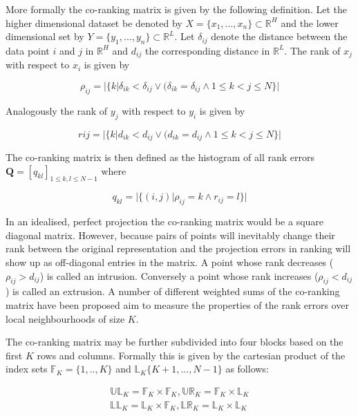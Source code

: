 More formally the co-ranking matrix is given by the following definition. Let the higher dimensional dataset be denoted by $X = \{x_1, ..., x_n\} \subset \mathbb{R}^H$ and the lower dimensional set by $Y = \{y_1, ..., y_n\} \subset \mathbb{R}^L$. Let $\delta_{ij}$ denote the distance between the data point $i$ and $j$ in $\mathbb{R}^H$ and $d_{ij}$ the corresponding distance in $\mathbb{R}^L$. The rank of $x_j$ with respect to $x_i$ is given by

\begin{equation}
	\rho_{ij} = |\{k | \delta_{ik} < \delta_{ij} \lor (\delta_{ik} = \delta_{ij} \land 1 \leq k < j \leq N\}|
\end{equation}

Analogously the rank of $y_j$ with respect to $y_i$ is given by

\begin{equation}
	r{ij} = |\{k | d_{ik} < d_{ij} \lor (d_{ik} = d_{ij} \land 1 \leq k < j \leq N\}|
\end{equation}

The co-ranking matrix is then defined as the histogram of all rank errors $\bm{Q} = [q_{kl}]_{1 \leq k, l \leq N-1}$ where

\begin{equation}
	q_{kl} = |\{(i,j) | \rho_{ij} = k \land r_{ij} = l\}|
\end{equation}

In an idealised, perfect projection the co-ranking matrix would be a square diagonal matrix. However, because pairs of points will inevitably change their rank between the original representation and the projection errors in ranking will show up as off-diagonal entries in the matrix. A point whose rank decreases ($\rho_{ij} > d_{ij}$)  is called an intrusion. Conversely a point whose rank increases ($\rho_{ij} < d_{ij}$) is called an extrusion. A number of different weighted sums of the co-ranking matrix have been proposed aim to measure the properties of the rank errors over local neighbourhoods of size $K$.

The co-ranking matrix may be further subdivided into four blocks based on the first $K$ rows and columns. Formally this is given by the cartesian product of the index sets $\mathbb{F}_K = \{1, .., K\}$ and $\mathbb{L}_K \{K+1, ..., N-1\}$ as follows:

\begin{align}
	\mathbb{UL}_K = \mathbb{F}_K \times \mathbb{F}_K,  \mathbb{UR}_K = \mathbb{F}_K \times \mathbb{L}_K
	\\
	\mathbb{LL}_K = \mathbb{L}_K \times \mathbb{F}_K,  \mathbb{LR}_K = \mathbb{L}_K \times \mathbb{L}_K
\end{align}

